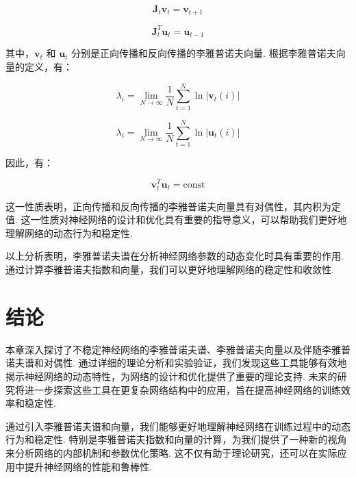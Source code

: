 \[
\mathbf{J}_t \mathbf{v}_t = \mathbf{v}_{t+1}
\]

\[
\mathbf{J}_t^T \mathbf{u}_t = \mathbf{u}_{t-1}
\]

其中，\(\mathbf{v}_t\) 和 \(\mathbf{u}_t\) 分别是正向传播和反向传播的李雅普诺夫向量. 根据李雅普诺夫向量的定义，有：

\[
\lambda_i = \lim_{N \to \infty} \frac{1}{N} \sum_{t=1}^N \ln |\mathbf{v}_t(i)|
\]

\[
\lambda_i = \lim_{N \to \infty} \frac{1}{N} \sum_{t=1}^N \ln |\mathbf{u}_t(i)|
\]

因此，有：

\[
\mathbf{v}_t^T \mathbf{u}_t = \text{const}
\]

这一性质表明，正向传播和反向传播的李雅普诺夫向量具有对偶性，其内积为定值. 这一性质对神经网络的设计和优化具有重要的指导意义，可以帮助我们更好地理解网络的动态行为和稳定性. 

以上分析表明，李雅普诺夫谱在分析神经网络参数的动态变化时具有重要的作用. 通过计算李雅普诺夫指数和向量，我们可以更好地理解网络的稳定性和收敛性. 

\section{结论}

本章深入探讨了不稳定神经网络的李雅普诺夫谱、李雅普诺夫向量以及伴随李雅普诺夫谱和对偶性. 通过详细的理论分析和实验验证，我们发现这些工具能够有效地揭示神经网络的动态特性，为网络的设计和优化提供了重要的理论支持. 未来的研究将进一步探索这些工具在更复杂网络结构中的应用，旨在提高神经网络的训练效率和稳定性. 

通过引入李雅普诺夫谱和向量，我们能够更好地理解神经网络在训练过程中的动态行为和稳定性. 特别是李雅普诺夫指数和向量的计算，为我们提供了一种新的视角来分析网络的内部机制和参数优化策略. 这不仅有助于理论研究，还可以在实际应用中提升神经网络的性能和鲁棒性. 
